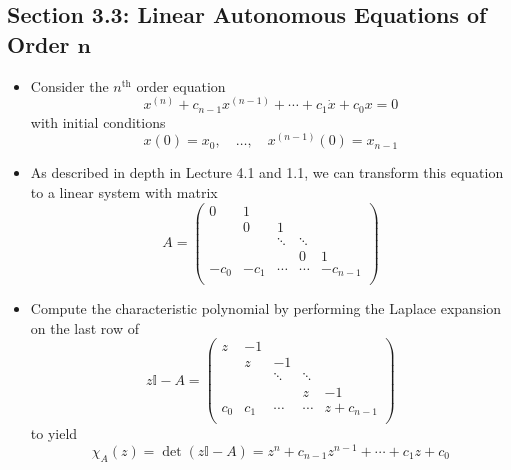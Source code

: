 \documentclass[../notes.tex]{subfiles}
\begin{document}
\subsection*{Section 3.3: Linear Autonomous Equations of Order \texorpdfstring{$\bm{n}$}{TEXT}}
\begin{itemize}
    \item Consider the $n^\text{th}$ order equation
    \begin{equation*}
        x^{(n)}+c_{n-1}x^{(n-1)}+\cdots+c_1\dot{x}+c_0x = 0
    \end{equation*}
    with initial conditions
    \begin{equation*}
        x(0) = x_0,\quad
        \dots,\quad
        x^{(n-1)}(0) = x_{n-1}
    \end{equation*}
    \item As described in depth in Lecture 4.1 and 1.1, we can transform this equation to a linear system with matrix
    \begin{equation*}
        A =
        \begin{pmatrix}
            0 & 1 &  &  & \\
             & 0 & 1 &  & \\
             &  & \ddots & \ddots & \\
             &  &  & 0 & 1\\
            -c_0 & -c_1 & \cdots & \cdots & -c_{n-1}\\
        \end{pmatrix}
    \end{equation*}
    \item Compute the characteristic polynomial by performing the Laplace expansion on the last row of
    \begin{equation*}
        z\mathbb{I}-A =
        \begin{pmatrix}
            z & -1 &  &  & \\
             & z & -1 &  & \\
             &  & \ddots & \ddots & \\
             &  &  & z & -1\\
            c_0 & c_1 & \cdots & \cdots & z+c_{n-1}\\
        \end{pmatrix}
    \end{equation*}
    to yield
    \begin{equation*}
        \chi_A(z) = \det(z\mathbb{I}-A)
        = z^n+c_{n-1}z^{n-1}+\cdots+c_1z+c_0
    \end{equation*}

\end{itemize}
\end{document}
